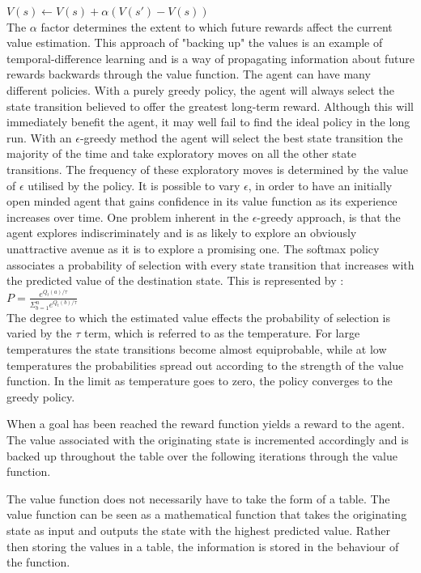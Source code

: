 \documentclass[a4paper]{article}%
\begin{document}
$V(s) \leftarrow V(s) + \alpha(V(s') - V(s))$\\

The $\alpha$ factor determines the extent to which future rewards affect the current value estimation. This approach of "backing up" the values is an example of temporal-difference learning\citep{suttonbarto} and is a way of propagating information about future rewards backwards through the value function.
The agent can have many different policies. With a purely greedy policy, the agent will always select the state transition believed to offer the greatest long-term reward. Although this will immediately benefit the agent, it may well fail to find the ideal policy in the long run. With an $\epsilon$-greedy method the agent will select the best state transition the majority of the time and take exploratory moves on all the other state transitions. The frequency of these exploratory moves is determined by the value of $\epsilon$ utilised by the policy. It is possible to vary $\epsilon$, in order to have an initially open minded agent that gains confidence in its value function as its experience increases over time. One problem inherent in the $\epsilon$-greedy approach, is that the agent explores indiscriminately and is as likely to explore an obviously unattractive avenue as it is to explore a promising one. The softmax policy associates a probability of selection with every state transition that increases with the predicted value of the destination state. This is represented by :\\

$P = \frac{e^{Q_{t}(a)/\tau}}{\Sigma_{b=1}^{n}e^{Q_{t}(b)/\tau}}$\\

The degree to which the estimated value effects the probability of selection is varied by the $\tau$ term, which is referred to as the temperature. For large temperatures the state transitions become almost equiprobable, while at low temperatures the probabilities spread out according to the strength of the value function. In the limit as temperature goes to zero, the policy converges to the greedy policy.

When a goal has been reached the reward function yields a reward to the agent.  The value  associated with the originating state is incremented accordingly and is backed up throughout the table over the following iterations through the value function\citep{suttonbarto}.

The value function does not necessarily have to take the form of a table. The value function can be seen as a mathematical function that takes the originating state as input and outputs the state with the highest predicted value. Rather then storing the values in a table, the information is stored in the behaviour of the function.
\end{document}
